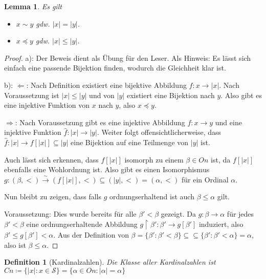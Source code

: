 \documentclass[german]{article}
\theoremstyle{break}
\theoremstyle{def_style}
\newtheorem{definition}{Definition}[section]
\theoremstyle{def_style}
\theoremstyle{lemma_style}
\newtheorem{lemma}{Lemma}[subsection]
\begin{document}
\begin{lemma}
	Es gilt
	\begin{itemize}
		\item[a)] $x\sim y$ gdw. $\vert x \vert = \vert y \vert$.
		\item[b)] $x\preceq y$ gdw. $\vert x \vert \leq \vert y \vert$.
	\end{itemize}
\end{lemma}
\begin{proof}
	a): Der Beweis dient als Übung für den Leser. Als Hinweis: Es lässt sich einfach eine passende Bijektion finden, wodurch die Gleichheit klar ist.
	\par
	b): $\Leftarrow$: Nach Definition existiert eine bijektive Abbildung $f:x\to\vert x \vert$. Nach Voraussetzung ist $\vert x \vert \leq \vert y \vert$ und von $\vert y \vert$ existiert eine Bijektion nach $y$. Also gibt es eine injektive Funktion von $x$ nach $y$, also $x\preceq y$.
	\par
	$\Rightarrow$: Nach Voraussetzung gibt es eine injektive Abbildung $f:x\to y$ und eine injektive Funktion $\hat f:\vert x \vert \to \vert  y \vert$. Weiter folgt offensichtlicherweise, dass $\hat f : \vert x \vert \to f[\vert x \vert]\subseteq \vert y \vert$ eine Bijektion auf eine Teilmenge von $\vert y \vert$ ist.
	
	Auch lässt sich erkennen, dass $f[\vert x \vert]$ isomorph zu einem $\beta\in On$ ist, da $f[\vert x\vert]$ ebenfalls eine Wohlordnung ist. Also gibt es einen Isomorphismus $g:(\beta, <)\xrightarrow{\sim}(f[\vert x \vert], <)\subseteq (\vert y \vert, <)=(\alpha, <)$ für ein Ordinal $\alpha$.
	
	Nun bleibt zu zeigen, dass falls $g$ ordnungserhaltend ist auch $\beta \leq \alpha$ gilt.
	
	Voraussetzung: Dies wurde bereits für alle $\beta'<\beta$ gezeigt. Da $g:\beta\to\alpha$ für jedes $\beta'<\beta$ eine ordnungserhaltende Abbildung $g\upharpoonright\beta':\beta'\to g[\beta']$ induziert, also $\beta'\leq g[\beta']< \alpha$. Aus der Definition von $\beta=\{\beta':\beta'<\beta\}\subseteq \subseteq\{\beta':\beta'<\alpha\}=\alpha$, also ist $\beta\leq\alpha$.
\end{proof}

\begin{definition}[Kardinalzahlen]
	Die Klasse aller \textit{Kardinalzahlen} ist $Cn\coloneqq\{\vert x \vert : x\in \mathcal{S}\}=\{\alpha\in On : \vert\alpha\vert=\alpha\}$
\end{definition}
\end{document}
